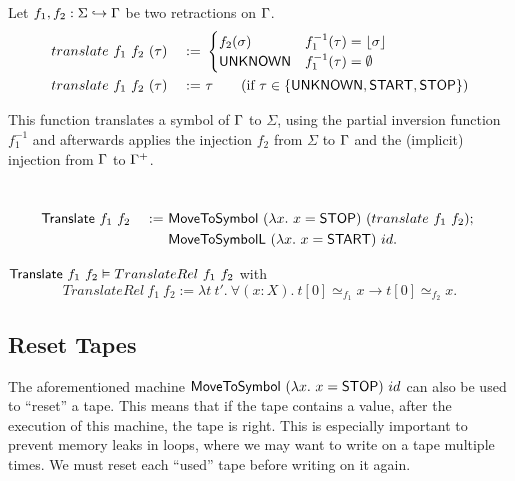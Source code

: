 \begin{definition}
  \label{def:translate}
  Let $f_1, f_2 : \Sigma \hookrightarrow \Gamma$ be two retractions on $\Gamma$.
  \begin{alignat*}{2}
    & translate~f_1~f_2~(\tau) &~:=~&
    \begin{cases}
      f_2(\sigma)  & f_1^{-1}(\tau) = \left\lfloor {\sigma} \right\rfloor \\
      \mathsf{UNKNOWN} & f_1^{-1}(\tau) = \emptyset
    \end{cases} \\
    & translate~f_1~f_2~(\tau) &~:=~& \tau \qquad\text{(if $\tau \in \{\mathsf{UNKNOWN}, \mathsf{START}, \mathsf{STOP}\}$)} 
  \end{alignat*}
\end{definition}

This function translates a symbol of $\Gamma$ to $\Sigma$, using the partial inversion function $f_1^{-1}$ and afterwards applies the injection $f_2$
from $\Sigma$ to $\Gamma$ and the (implicit) injection from $\Gamma$ to $\Gamma^+$.

\begin{definition}[$\MS{Translate}$]
  ~
  \begin{alignat*}{2}
    & \mathsf{Translate}~f_1~f_2 &~:=~& \mathsf{MoveToSymbol}~(\lambda x.~x=\mathsf{STOP})~(translate~f_1~f_2) ;~ \\
    &                        &~  ~& \mathsf{MoveToSymbolL}~(\lambda x.~x=\mathsf{START})~id.
  \end{alignat*}
\end{definition}

\begin{lemma}
  $\mathsf{Translate}~f_1~f_2 \mathrel{\vDash} TranslateRel~f_1~f_2$ with
  \[
    TranslateRel~f_1~f_2 := \lambda t~t'.~\forall(x:X).~t[0] \simeq_{f_1} x \rightarrow t[0] \simeq_{f_2} x.
  \]
\end{lemma}


\subsection{Reset Tapes}
\label{sec:reset-tape}

The aforementioned machine $\mathsf{MoveToSymbol}~(\lambda x.~x=\mathsf{STOP})~id$ can also be used to ``reset'' a tape.  This means that if the tape contains
a value, after the execution of this machine, the tape is right.  This is especially important to prevent memory leaks in loops, where we may want to
write on a tape multiple times.  We must reset each ``used'' tape before writing on it again.

